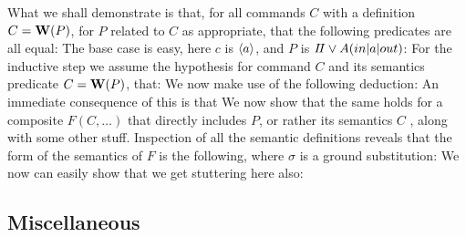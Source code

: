 What we shall demonstrate is that, for all commands $C$
with a definition $C = \mathbf{W}(P)$, for $P$ related to $C$ as appropriate,
that the following predicates are all equal:
The base case is easy, here $c$ is $\langle a\rangle$,
and $P$ is $I\!I \lor A(in|a|out)$:
For the inductive step we assume the hypothesis
for command $C$ and its semantics predicate  $C = \mathbf{W}(P)$,
that:
We now make use of the following deduction:
An immediate consequence of this is that
We now show that the same holds for a composite $F(C,\ldots)$
that directly includes $P$, or rather its semantics $C$
, along with some other stuff.
Inspection of all the semantic definitions reveals
that the form of the semantics of $F$ is the following,
where $\sigma$ is a ground substitution:
We now can easily show that we get stuttering here also:

\subsection{Miscellaneous}

